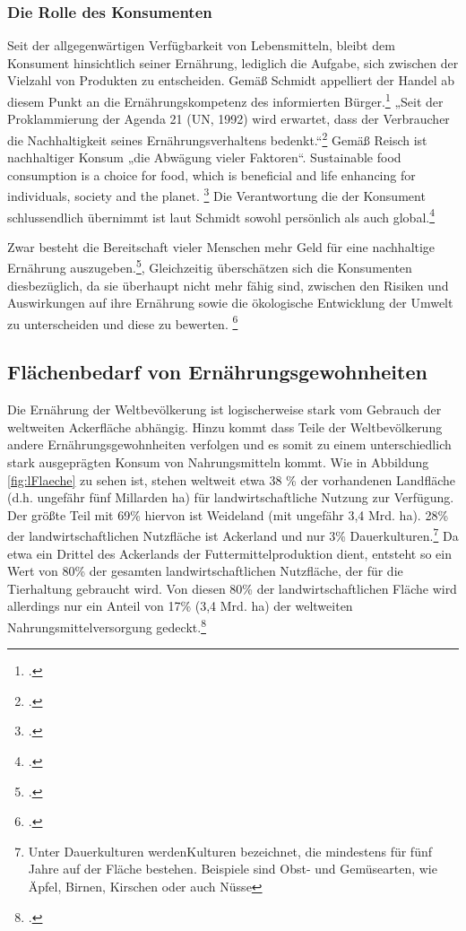 \documentclass{scrartcl}
\begin{document}
\subsubsection{Die Rolle des Konsumenten}
Seit der allgegenwärtigen Verfügbarkeit von Lebensmitteln, bleibt dem Konsument hinsichtlich seiner Ernährung, lediglich die Aufgabe, sich zwischen der Vielzahl von Produkten zu entscheiden. Gemäß Schmidt appelliert der Handel ab diesem Punkt an die Ernährungskompetenz des informierten Bürger.\footcite[S.20]{SchmidtDieVon} „Seit der Proklammierung der Agenda 21 (UN, 1992) wird erwartet, dass der Verbraucher die Nachhaltigkeit seines Ernährungsverhaltens bedenkt.“\footcite[S.20]{SchmidtDieVon} Gemäß Reisch ist nachhaltiger Konsum „die Abwägung vieler Faktoren“. 
Sustainable food consumption is a choice for food, which is beneficial and life enhancing for individuals, society and the planet. \footcite{article}
Die Verantwortung die der Konsument schlussendlich übernimmt ist laut Schmidt sowohl persönlich als auch global.\footcite{SchmidtDieVon}

Zwar besteht die Bereitschaft vieler Menschen mehr Geld für eine nachhaltige Ernährung auszugeben.\footcite[Vgl.][S.10f]{Rodiger2015HowReview},
Gleichzeitig überschätzen sich die Konsumenten diesbezüglich, da sie überhaupt nicht mehr fähig sind, zwischen den Risiken und Auswirkungen auf ihre Ernährung sowie die ökologische Entwicklung der Umwelt zu unterscheiden und diese zu bewerten. \footcites[Vgl.][S.10f]{Rodiger2015HowReview}[S.121f]{Stierand2008StadtLebensmittel}\\

\subsection{Flächenbedarf von Ernährungsgewohnheiten} 

Die Ernährung der Weltbevölkerung ist logischerweise stark vom Gebrauch der weltweiten Ackerfläche abhängig. Hinzu kommt dass Teile der Weltbevölkerung andere Ernährungsgewohnheiten verfolgen und es somit zu einem unterschiedlich stark ausgeprägten Konsum von Nahrungsmitteln kommt. Wie in Abbildung \ref{fig:lFlaeche} zu sehen ist, stehen weltweit etwa 38 \% der vorhandenen Landfläche (d.h. ungefähr fünf Millarden ha) für landwirtschaftliche Nutzung zur Verfügung. Der größte Teil mit 69\% hiervon ist Weideland (mit ungefähr 3,4 Mrd. ha). 28\% der landwirtschaftlichen Nutzfläche ist Ackerland und nur 3\% Dauerkulturen.\footnote{Unter Dauerkulturen werdenKulturen bezeichnet, die mindestens für fünf Jahre auf der Fläche bestehen. Beispiele sind Obst- und Gemüsearten, wie Äpfel, Birnen, Kirschen oder auch Nüsse}
Da etwa ein Drittel des Ackerlands der Futtermittelproduktion dient, entsteht so ein Wert von 80\% der gesamten landwirtschaftlichen Nutzfläche, der für die Tierhaltung gebraucht wird. Von diesen 80\% der landwirtschaftlichen Fläche wird allerdings nur ein Anteil von 17\% (3,4 Mrd. ha) der weltweiten Nahrungsmittelversorgung gedeckt.\footcites[]{2008FAOSTAT}[Vgl.][S.6]{VonKoerber2008Globale-trends}
\end{document}
